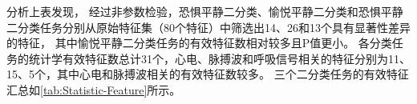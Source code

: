 \vspace{-1ex}
分析上表发现，
经过非参数检验，恐惧平静二分类、愉悦平静二分类和恐惧平静二分类任务分别从原始特征集（80个特征）中筛选出14、26和13个具有显著性差异的特征，
其中愉悦平静二分类任务的有效特征数相对较多且P值更小。
各分类任务的统计学有效特征数总计31个，心电、脉搏波和呼吸信号相关的特征分别为11、15、5个，其中心电和脉搏波相关的有效特征数较多。
三个二分类任务的有效特征汇总如\autoref{tab:Statistic-Feature}所示。
\begin{table}[htbp]
    \centering
    \footnotesize
    \setlength{\abovecaptionskip}{0.1cm}
    \setlength{\belowcaptionskip}{0.2cm}
    \renewcommand\arraystretch{1.5}
    \caption[不同分类任务的统计学有效特征集]{不同分类任务的统计学有效特征集}
    \label{tab:Statistic-Feature}
\end{table}
